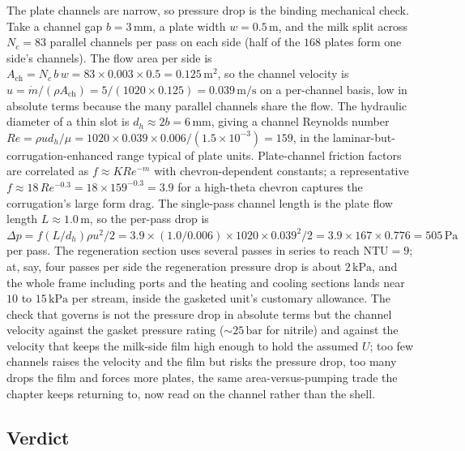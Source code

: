 The plate channels are narrow, so pressure drop is the binding mechanical check.
Take a channel gap $b = 3\,\si{\milli\meter}$, a plate width $w = 0.5\,\text{m}$,
and the milk split across $N_c = 83$ parallel channels per pass on each side
(half of the $168$ plates form one side's channels). The flow area per side is
$A_{\text{ch}} = N_c\, b\, w = 83\times 0.003\times 0.5 = 0.125\,\text{m}^2$, so
the channel velocity is $u = \dot{m}/(\rho A_{\text{ch}}) = 5/(1020\times 0.125)
= 0.039\,\text{m/s}$ on a per-channel basis, low in absolute terms because the
many parallel channels share the flow. The hydraulic diameter of a thin slot is
$d_h \approx 2b = 6\,\si{\milli\meter}$, giving a channel Reynolds number $Re =
\rho u d_h/\mu = 1020\times 0.039\times 0.006/(1.5\times 10^{-3}) = 159$, in the
laminar-but-corrugation-enhanced range typical of plate units. Plate-channel
friction factors are correlated as $f \approx K Re^{-m}$ with chevron-dependent
constants; a representative $f \approx 18\,Re^{-0.3} = 18\times 159^{-0.3} = 3.9$
for a high-theta chevron captures the corrugation's large form drag. The
single-pass channel length is the plate flow length $L \approx 1.0\,\text{m}$, so
the per-pass drop is $\Delta p = f (L/d_h)\rho u^2/2 = 3.9\times (1.0/0.006)
\times 1020\times 0.039^2/2 = 3.9\times 167\times 0.776 = 505\,\text{Pa}$ per
pass. The regeneration section uses several passes in series to reach
$\text{NTU} = 9$; at, say, four passes per side the regeneration pressure drop is
about $2\,\text{kPa}$, and the whole frame including ports and the heating and
cooling sections lands near $10$ to $15\,\text{kPa}$ per stream, inside the
gasketed unit's customary allowance. The check that governs is not the pressure
drop in absolute terms but the channel velocity against the gasket pressure
rating ($\sim 25\,\text{bar}$ for nitrile) and against the velocity that keeps
the milk-side film high enough to hold the assumed $U$; too few channels raises
the velocity and the film but risks the pressure drop, too many drops the film
and forces more plates, the same area-versus-pumping trade the chapter keeps
returning to, now read on the channel rather than the shell.

\subsection{Verdict}

